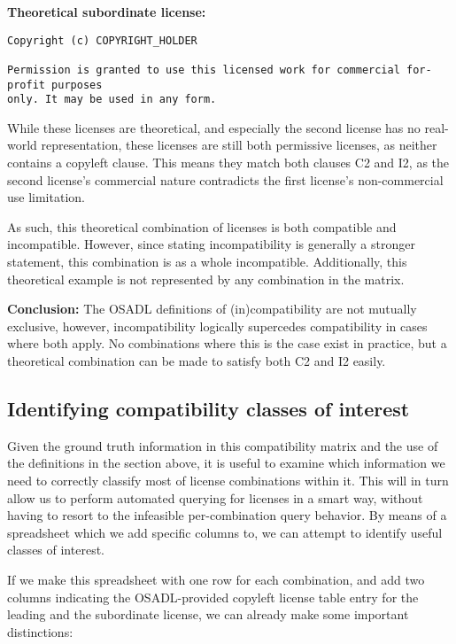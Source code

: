 \textbf{Theoretical subordinate license:}

\begin{verbatim}
Copyright (c) COPYRIGHT_HOLDER

Permission is granted to use this licensed work for commercial for-profit purposes
only. It may be used in any form.
\end{verbatim}

While these licenses are theoretical, and especially the second license has no real-world representation, these licenses are still both permissive licenses, as neither contains a copyleft clause. This means they match both clauses C2 and I2, as the second license's commercial nature contradicts the first license's non-commercial use limitation.

As such, this theoretical combination of licenses is both compatible and incompatible. However, since stating incompatibility is generally a stronger statement, this combination is as a whole incompatible. Additionally, this theoretical example is not represented by any combination in the matrix.

\textbf{Conclusion:} The OSADL definitions of (in)compatibility are not mutually exclusive, however, incompatibility logically supercedes compatibility in cases where both apply. No combinations where this is the case exist in practice, but a theoretical combination can be made to satisfy both C2 and I2 easily.

\subsection{Identifying compatibility classes of interest}

Given the ground truth information in this compatibility matrix and the use of the definitions in the section above, it is useful to examine which information we need to correctly classify most of license combinations within it. This will in turn allow us to perform automated querying for licenses in a smart way, without having to resort to the infeasible per-combination query behavior. By means of a spreadsheet which we add specific columns to, we can attempt to identify useful classes of interest.

If we make this spreadsheet with one row for each combination, and add two columns indicating the OSADL-provided copyleft license table entry for the leading and the subordinate license, we can already make some important distinctions:

